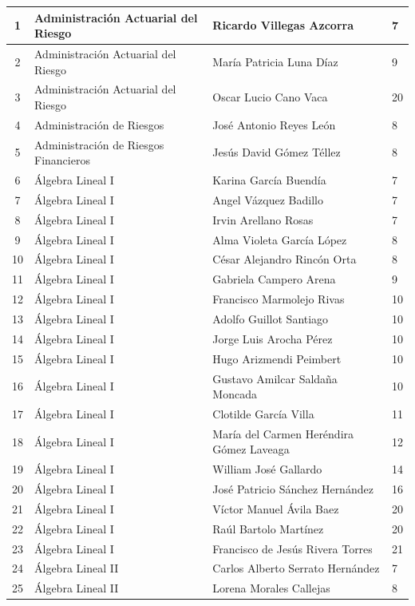 {\begin{longtable}{|c|p{6.5cm}|p{5cm}|p{1.5cm}|}
1 & Administración Actuarial del Riesgo & Ricardo Villegas Azcorra & 7 \\ \hline
2 & Administración Actuarial del Riesgo & María Patricia Luna Díaz & 9 \\ \hline
3 & Administración Actuarial del Riesgo & Oscar Lucio Cano Vaca & 20 \\ \hline
4 & Administración de Riesgos & José Antonio Reyes León & 8 \\ \hline
5 & Administración de Riesgos Financieros & Jesús David Gómez Téllez & 8 \\ \hline
6 & Álgebra Lineal I & Karina García Buendía & 7 \\ \hline
7 & Álgebra Lineal I & Angel Vázquez Badillo & 7 \\ \hline
8 & Álgebra Lineal I & Irvin Arellano Rosas & 7 \\ \hline
9 & Álgebra Lineal I & Alma Violeta García López & 8 \\ \hline
10 & Álgebra Lineal I & César Alejandro Rincón Orta & 8 \\ \hline
11 & Álgebra Lineal I & Gabriela Campero Arena & 9 \\ \hline
12 & Álgebra Lineal I & Francisco Marmolejo Rivas & 10 \\ \hline
13 & Álgebra Lineal I & Adolfo Guillot Santiago & 10 \\ \hline
14 & Álgebra Lineal I & Jorge Luis Arocha Pérez & 10 \\ \hline
15 & Álgebra Lineal I & Hugo Arizmendi Peimbert & 10 \\ \hline
16 & Álgebra Lineal I & Gustavo Amilcar Saldaña Moncada & 10 \\ \hline
17 & Álgebra Lineal I & Clotilde García Villa & 11 \\ \hline
18 & Álgebra Lineal I & María del Carmen Heréndira Gómez Laveaga & 12 \\ \hline
19 & Álgebra Lineal I & William José Gallardo & 14 \\ \hline
20 & Álgebra Lineal I & José Patricio Sánchez Hernández & 16 \\ \hline
21 & Álgebra Lineal I & Víctor Manuel Ávila Baez & 20 \\ \hline
22 & Álgebra Lineal I & Raúl Bartolo Martínez & 20 \\ \hline
23 & Álgebra Lineal I & Francisco de Jesús Rivera Torres & 21 \\ \hline
24 & Álgebra Lineal II & Carlos Alberto Serrato Hernández & 7 \\ \hline
25 & Álgebra Lineal II & Lorena Morales Callejas & 8 \\ \hline

\end{longtable}}

